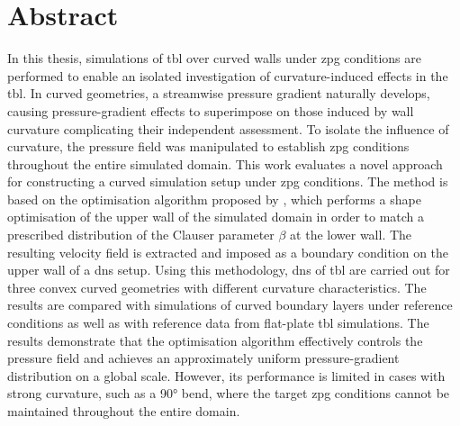 \chapter*{Abstract}

In this thesis, simulations of \acrfull{tbl} over curved walls under \acrfull{zpg} conditions are performed to enable an isolated investigation of curvature-induced effects in the \acrshort{tbl}.  
In curved geometries, a streamwise pressure gradient naturally develops, causing pressure-gradient effects to superimpose on those induced by wall curvature complicating their independent assessment. To isolate the influence of curvature, the pressure field was manipulated to establish \acrshort{zpg} conditions throughout 
 the entire simulated domain.
This work evaluates a novel approach for constructing a curved simulation setup under \acrshort{zpg} conditions.
The method is based on the optimisation algorithm proposed by \citet{morita_applying_2022}, which performs a shape optimisation  of the upper wall of the simulated domain in order to match a prescribed distribution of the Clauser parameter $\beta$ at the lower wall.
The resulting velocity field is extracted and imposed as a  boundary condition on the upper wall of a \acrlong{dns} setup.
Using this methodology,  \acrlong{dns} of \acrlong{tbl} are carried out for three convex curved geometries with different curvature characteristics.
The results are compared with simulations of curved boundary layers under reference conditions as well as with reference data from flat-plate \acrlong{tbl} simulations.
The results demonstrate that the optimisation algorithm effectively controls  the pressure field and achieves an approximately uniform pressure-gradient distribution on a global scale. 
However, its performance is limited in cases with strong curvature, such as a 90° bend, where the target \acrshort{zpg} conditions cannot be maintained throughout the entire domain.

